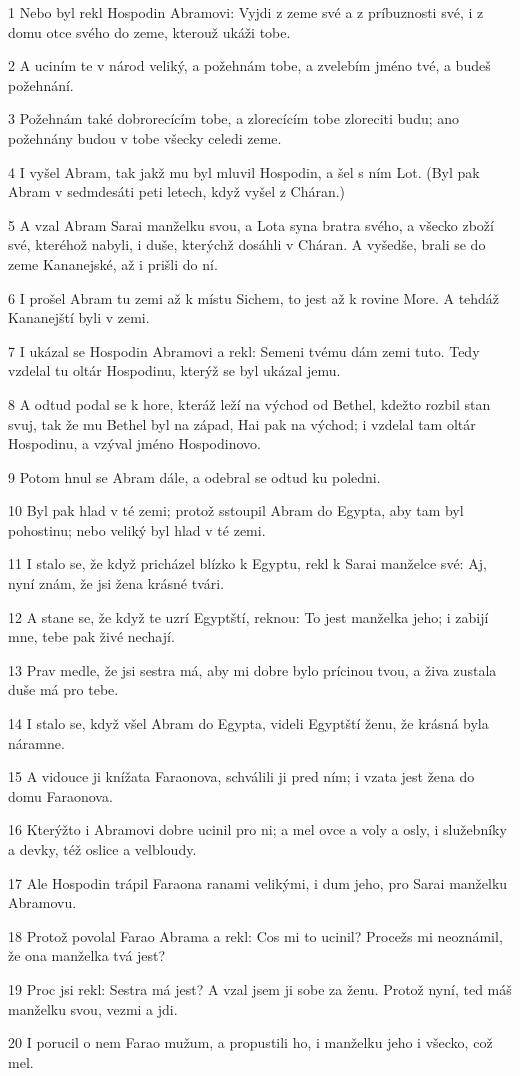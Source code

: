 \par 1 Nebo byl rekl Hospodin Abramovi: Vyjdi z zeme své a z príbuznosti své, i z domu otce svého do zeme, kterouž ukáži tobe.
\par 2 A uciním te v národ veliký, a požehnám tobe, a zvelebím jméno tvé, a budeš požehnání.
\par 3 Požehnám také dobrorecícím tobe, a zlorecícím tobe zloreciti budu; ano požehnány budou v tobe všecky celedi zeme.
\par 4 I vyšel Abram, tak jakž mu byl mluvil Hospodin, a šel s ním Lot. (Byl pak Abram v sedmdesáti peti letech, když vyšel z Cháran.)
\par 5 A vzal Abram Sarai manželku svou, a Lota syna bratra svého, a všecko zboží své, kteréhož nabyli, i duše, kterýchž dosáhli v Cháran. A vyšedše, brali se do zeme Kananejské, až i prišli do ní.
\par 6 I prošel Abram tu zemi až k místu Sichem, to jest až k rovine More. A tehdáž Kananejští byli v zemi.
\par 7 I ukázal se Hospodin Abramovi a rekl: Semeni tvému dám zemi tuto. Tedy vzdelal tu oltár Hospodinu, kterýž se byl ukázal jemu.
\par 8 A odtud podal se k hore, kteráž leží na východ od Bethel, kdežto rozbil stan svuj, tak že mu Bethel byl na západ, Hai pak na východ; i vzdelal tam oltár Hospodinu, a vzýval jméno Hospodinovo.
\par 9 Potom hnul se Abram dále, a odebral se odtud ku poledni.
\par 10 Byl pak hlad v té zemi; protož sstoupil Abram do Egypta, aby tam byl pohostinu; nebo veliký byl hlad v té zemi.
\par 11 I stalo se, že když pricházel blízko k Egyptu, rekl k Sarai manželce své: Aj, nyní znám, že jsi žena krásné tvári.
\par 12 A stane se, že když te uzrí Egyptští, reknou: To jest manželka jeho; i zabijí mne, tebe pak živé nechají.
\par 13 Prav medle, že jsi sestra má, aby mi dobre bylo prícinou tvou, a živa zustala duše má pro tebe.
\par 14 I stalo se, když všel Abram do Egypta, videli Egyptští ženu, že krásná byla náramne.
\par 15 A vidouce ji knížata Faraonova, schválili ji pred ním; i vzata jest žena do domu Faraonova.
\par 16 Kterýžto i Abramovi dobre ucinil pro ni; a mel ovce a voly a osly, i služebníky a devky, též oslice a velbloudy.
\par 17 Ale Hospodin trápil Faraona ranami velikými, i dum jeho, pro Sarai manželku Abramovu.
\par 18 Protož povolal Farao Abrama a rekl: Cos mi to ucinil? Procežs mi neoznámil, že ona manželka tvá jest?
\par 19 Proc jsi rekl: Sestra má jest? A vzal jsem ji sobe za ženu. Protož nyní, ted máš manželku svou, vezmi a jdi.
\par 20 I porucil o nem Farao mužum, a propustili ho, i manželku jeho i všecko, což mel.

